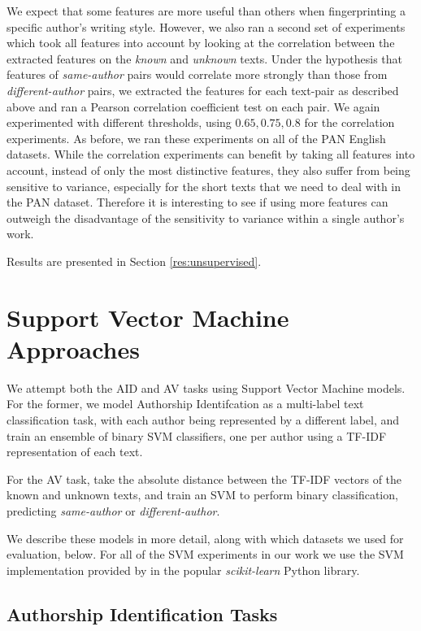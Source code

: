 We expect that some features are more useful than others when fingerprinting a specific author's writing style. 
However, we also ran a second set of experiments which took all features into account by looking at the correlation between the extracted features on the \textit{known} and \textit{unknown} texts.
Under the hypothesis that features of \textit{same-author} pairs would correlate more strongly than those from \textit{different-author} pairs, we extracted the features for each text-pair as described above and ran a Pearson correlation coefficient test on each pair. 
We again experimented with different thresholds, using ${0.65, 0.75, 0.8}$ for the correlation experiments. As before, we ran these experiments on all of the PAN English datasets. While the correlation experiments can benefit by taking all features into account, instead of only the most distinctive features, they also suffer from being sensitive to variance, especially for the short texts that we need to deal with in the PAN dataset. Therefore it is interesting to see if using more features can outweigh the disadvantage of the sensitivity to variance within a single author's work.

Results are presented in Section \ref{res:unsupervised}.


\section{Support Vector Machine Approaches}
We attempt both the AID and AV tasks using Support Vector Machine models. For the former, we model Authorship Identifcation as a multi-label text classification task, with each author being represented by a different label, and train an ensemble of binary SVM classifiers, one per author using a TF-IDF representation of each text.

For the AV task, take the absolute distance between the TF-IDF vectors of the known and unknown texts, and train an SVM to perform binary classification, predicting \textit{same-author} or \textit{different-author}. 

We describe these models in more detail, along with which datasets we used for evaluation, below. For all of the SVM experiments in our work we use the SVM implementation provided by \citet{scikit-learn} in the popular \textit{scikit-learn} Python library.

\subsection{Authorship Identification Tasks}
\label{svmaid}

